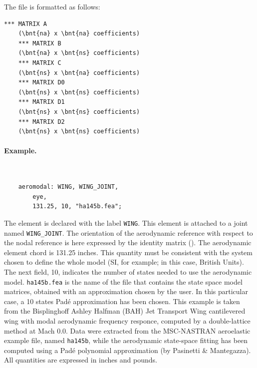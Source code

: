 The file is formatted as follows:
\begin{Verbatim}[commandchars=\\\{\}]
    *** MATRIX A
    (\bnt{na} x \bnt{na} coefficients)
    *** MATRIX B
    (\bnt{na} x \bnt{ns} coefficients)
    *** MATRIX C
    (\bnt{ns} x \bnt{na} coefficients)
    *** MATRIX D0
    (\bnt{ns} x \bnt{ns} coefficients)
    *** MATRIX D1
    (\bnt{ns} x \bnt{ns} coefficients)
    *** MATRIX D2
    (\bnt{ns} x \bnt{ns} coefficients)
\end{Verbatim}

\paragraph{Example.} \
\begin{verbatim}
    aeromodal: WING, WING_JOINT,
        eye,
        131.25, 10, "ha145b.fea";
\end{verbatim}
The  element is declared with the label \texttt{WING}.
This element is attached to a \kw{modal} joint 
named \texttt{WING\_JOINT}.
The orientation of the aerodynamic reference with respect 
to the nodal reference is here expressed by the identity matrix ().
The aerodynamic element chord is 131.25 inches.
This quantity must be consistent with the system chosen to define 
the whole model (SI, for example; in this case, British Units).
The next field, 10, indicates the number of states needed to use 
the aerodynamic model.
\texttt{ha145b.fea} is the name of the file that contains
the state space model matrices, obtained with an approximation 
chosen by the user.
In this particular case, a 10 states Pad\'e approximation 
has been chosen.
This example is taken from the Bisplinghoff Ashley Halfman
(BAH) Jet Transport Wing cantilevered wing with modal aerodynamic 
frequency responce, computed by a double-lattice method at Mach 0.0.
Data were extracted from the MSC-NASTRAN aeroelastic example file, 
named \texttt{ha145b}, while the aerodynamic state-space fitting 
has been computed using a Pad\'e polynomial approximation
(by Pasinetti \& Mantegazza).
All quantities are expressed in inches and pounds.



